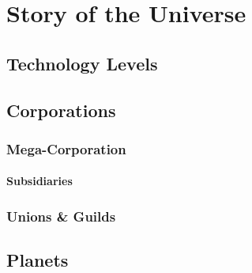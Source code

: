 \part{Story of the Universe}\label{part:story}

\chapter{Technology Levels}\label{ch:tech_lore}

\section{\dieselt}\label{sec:dieseltech_lore}

\section{\cybert}\label{sec:cybertech_lore}

\section{\biot}\label{sec:biotech_lore}

\section{\magit}\label{sec:magitech_lore}

\chapter{Corporations}\label{ch:corp_lore}

\section{Mega-Corporation}\label{sec:megacorp_lore}

\subsection{Subsidiaries}\label{subsec:subcorp_lore}

\section{Unions \& Guilds}\label{sec:unions_guilds}

\chapter{Planets}\label{ch:planets}

